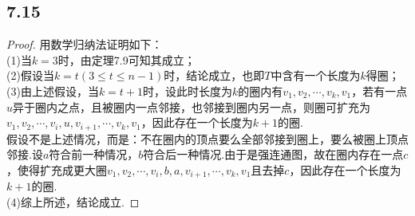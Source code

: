 \documentclass[twocolumn]{article}
\newenvironment{SChinese}{%
	\CJKfamily{gbsn}%
	\CJKtilde
	\CJKnospace}{}
\begin{document}
\begin{CJK}{UTF8}{}
\begin{SChinese}
				\subsection*{7.15}
					\begin{proof}
						用数学归纳法证明如下：\\
						(1)\quad 当$k=3$时，由定理7.9可知其成立；\\
						(2)\quad 假设当$k=t(3\le t\le n-1)$时，结论成立，也即$T$中含有一个长度为$k$得圈；
						(3)\quad 由上述假设，当$k=t+1$时，设此时长度为$k$的圈内有$v_1,v_2,\cdots,v_k,v_1$，若有一点$u$异于圈内之点，且被圈内一点邻接，也邻接到圈内另一点，则圈可扩充为$v_1,v_2,\cdots,v_i,u,v_{i+1},\cdots,v_k,v_1$，因此存在一个长度为$k+1$的圈.\\
						假设不是上述情况，而是：不在圈内的顶点要么全部邻接到圈上，要么被圈上顶点邻接.设$a$符合前一种情况，$b$符合后一种情况.由于是强连通图，故在圈内存在一点$c$，使得扩充成更大圈$v_1,v_2,\cdots,v_i,b,a,v_{i+1},\cdots,v_k,v_1$且去掉$c$，因此存在一个长度为$k+1$的圈. \\
						(4)\quad 综上所述，结论成立.
					\end{proof}
		\end{SChinese}
	\end{CJK}
\end{document}
